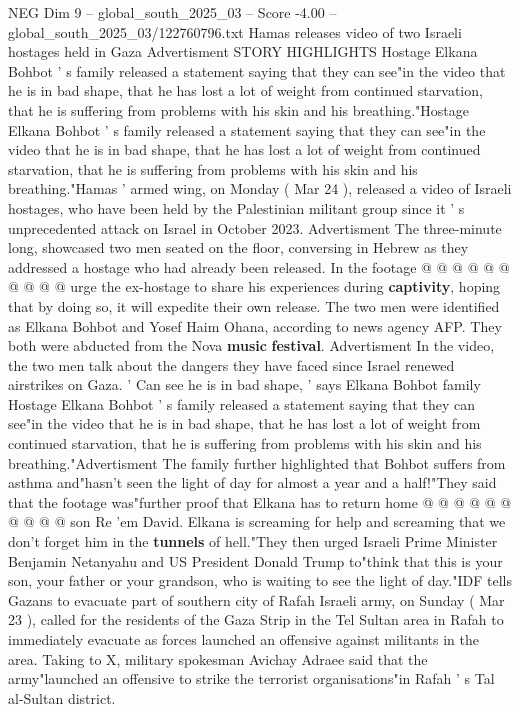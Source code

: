 \begin{textsample}{NEG Dim 9 – global\_south\_2025\_03 – Score -4.00 – global\_south\_2025\_03/122760796.txt}  \label{ex:f9_neg_400}
Hamas releases video of two Israeli hostages held in Gaza Advertisment STORY HIGHLIGHTS Hostage Elkana Bohbot ' s family released a statement saying that they can see"in the video that he is in bad shape, that he has lost a lot of weight from continued starvation, that he is suffering from problems with his skin and his breathing."Hostage Elkana Bohbot ' s family released a statement saying that they can see"in the video that he is in bad shape, that he has lost a lot of weight from continued starvation, that he is suffering from problems with his skin and his breathing."Hamas ' armed wing, on Monday ( Mar 24 ), released a video of Israeli hostages, who have been held by the Palestinian militant group since it ' s unprecedented attack on Israel in October 2023.
Advertisment The three-minute long, showcased two men seated on the floor, conversing in Hebrew as they addressed a hostage who had already been released.
In the footage @ @ @ @ @ @ @ @ @ @ urge the ex-hostage to share his experiences during \textbf{captivity}, hoping that by doing so, it will expedite their own release.
The two men were identified as Elkana Bohbot and Yosef Haim Ohana, according to news agency AFP.
They both were abducted from the Nova \textbf{music} \textbf{festival}.
Advertisment In the video, the two men talk about the dangers they have faced since Israel renewed airstrikes on Gaza. ' Can see he is in bad shape, ' says Elkana Bohbot family Hostage Elkana Bohbot ' s family released a statement saying that they can see"in the video that he is in bad shape, that he has lost a lot of weight from continued starvation, that he is suffering from problems with his skin and his breathing."Advertisment The family further highlighted that Bohbot suffers from asthma and"hasn't seen the light of day for almost a year and a half!"They said that the footage was"further proof that Elkana has to return home @ @ @ @ @ @ @ @ @ @ son Re 'em David.
Elkana is screaming for help and screaming that we don't forget him in the \textbf{tunnels} of hell."They then urged Israeli Prime Minister Benjamin Netanyahu and US President Donald Trump to"think that this is your son, your father or your grandson, who is waiting to see the light of day."IDF tells Gazans to evacuate part of southern city of Rafah Israeli army, on Sunday ( Mar 23 ), called for the residents of the Gaza Strip in the Tel Sultan area in Rafah to immediately evacuate as forces launched an offensive against militants in the area.
Taking to X, military spokesman Avichay Adraee said that the army"launched an offensive to strike the terrorist organisations"in Rafah ' s Tal al-Sultan district.

\end{textsample}

